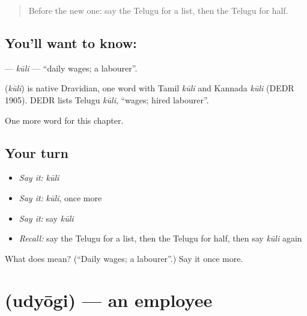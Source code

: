 \label{lesson:TE-C310-kuli}



\begin{quote}
Before the new one: say the Telugu for a list, then the Telugu for half.
\end{quote}

\subsection*{You'll want to know: }
\textbf{} — \emph{kūli} — \textquotedblleft{}daily wages; a labourer\textquotedblright{}.

\begin{cousinweb}
\textbf{} (\emph{kūli}) is native Dravidian, one word with Tamil \emph{kūli} and Kannada \emph{kūli} (DEDR 1905). DEDR lists Telugu \emph{kūli}, \textquotedblleft{}wages; hired labourer\textquotedblright{}.
\end{cousinweb}

\begin{grammarlens}[title={What you've built}]
One more word for this chapter.
\end{grammarlens}

\subsection*{Your turn}
\begin{itemize}
\raggedright
  \item \emph{Say it:} \emph{kūli}
  \item \emph{Say it:} \emph{kūli}, once more
  \item \emph{Say it:} say \emph{kūli}
  \item \emph{Recall:} say the Telugu for a list, then the Telugu for half, then say \emph{kūli} again
\end{itemize}

\begin{tcolorbox}[breakable,colback=teal!4,colframe=teal!35!black,title={Before you move on}]
What does  mean? (\textquotedblleft{}Daily wages; a labourer\textquotedblright{}.) Say it once more.
\end{tcolorbox}
\section[\texorpdfstring{\te{ఉద్యోగి} (udyōgi)}{ఉద్యోగి (udyōgi)}]{ (udyōgi) — an employee}

